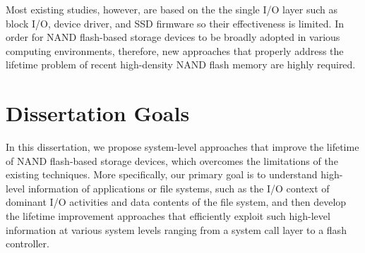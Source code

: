 Most existing studies, however, are based on the the single I/O layer such as 
block I/O, device driver, and SSD firmware so their effectiveness is limited.
In order for NAND flash-based storage devices to be broadly adopted in
various computing environments, therefore,
new approaches that properly address the lifetime problem of recent
high-density NAND flash memory are highly required.

\begin{comment}
As the price-per-byte of NAND flash memory is rapidly decreasing,
NAND flash-based solid-state drives (SSDs) are emerging as a viable high-performance storage solution
for laptops, desktop PCs and high-performance enterprise systems.
However, as NAND flash memory technology scales down to 20-nm and below, storing data reliably in NAND flash memory
gets a key design challenge of NAND-based storage systems. 
For example, the number of program/erase (P/E) cycles allowed for each block is significantly reduced in recent triple-level cell (TLC)
NAND technology.
While older 5x-nm single-level cell (SLC) NAND flash memory can support about 10 K P/E cycles, recent 2x-nm TLC NAND flash memory
can barely support about 1 K P/E cycles~\cite{tlc}.
\end{comment}

\section{Dissertation Goals}
In this dissertation, we propose system-level approaches that improve 
the lifetime of NAND flash-based storage devices, which overcomes the limitations
of the existing techniques. More specifically, our primary goal is to understand 
high-level information of applications or file systems, such as the 
I/O context of dominant I/O activities and data contents of the file system,
and then develop the lifetime improvement approaches that efficiently exploit such
high-level information at various system levels ranging from a system call layer 
to a flash controller.

